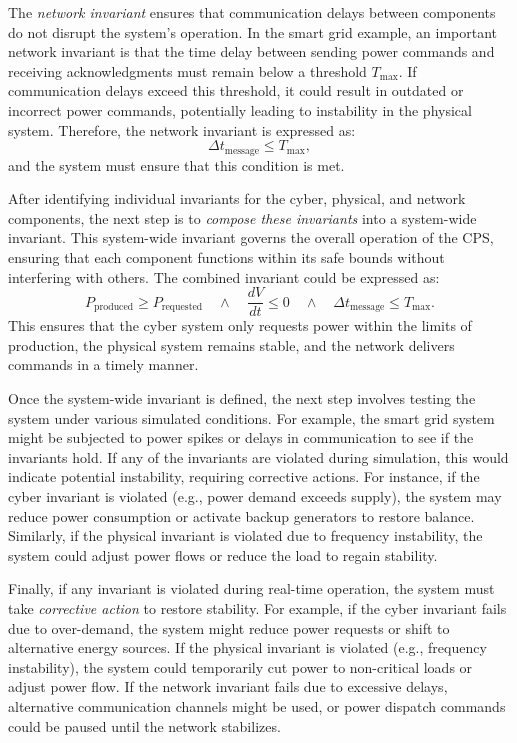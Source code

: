 The \textit{network invariant} ensures that communication delays between components do not disrupt the system's operation. In the smart grid example, an important network invariant is that the time delay between sending power commands and receiving acknowledgments must remain below a threshold \( T_{\text{max}} \). If communication delays exceed this threshold, it could result in outdated or incorrect power commands, potentially leading to instability in the physical system. Therefore, the network invariant is expressed as:
\[
\Delta t_{\text{message}} \leq T_{\text{max}},
\]
and the system must ensure that this condition is met.

After identifying individual invariants for the cyber, physical, and network components, the next step is to \textit{compose these invariants} into a system-wide invariant. This system-wide invariant governs the overall operation of the CPS, ensuring that each component functions within its safe bounds without interfering with others. The combined invariant could be expressed as:
\[
P_{\text{produced}} \geq P_{\text{requested}} \quad \land \quad \frac{dV}{dt} \leq 0 \quad \land \quad \Delta t_{\text{message}} \leq T_{\text{max}}.
\]
This ensures that the cyber system only requests power within the limits of production, the physical system remains stable, and the network delivers commands in a timely manner.

Once the system-wide invariant is defined, the next step involves testing the system under various simulated conditions. For example, the smart grid system might be subjected to power spikes or delays in communication to see if the invariants hold. If any of the invariants are violated during simulation, this would indicate potential instability, requiring corrective actions. For instance, if the cyber invariant is violated (e.g., power demand exceeds supply), the system may reduce power consumption or activate backup generators to restore balance. Similarly, if the physical invariant is violated due to frequency instability, the system could adjust power flows or reduce the load to regain stability.

Finally, if any invariant is violated during real-time operation, the system must take \textit{corrective action} to restore stability. For example, if the cyber invariant fails due to over-demand, the system might reduce power requests or shift to alternative energy sources. If the physical invariant is violated (e.g., frequency instability), the system could temporarily cut power to non-critical loads or adjust power flow. If the network invariant fails due to excessive delays, alternative communication channels might be used, or power dispatch commands could be paused until the network stabilizes.

